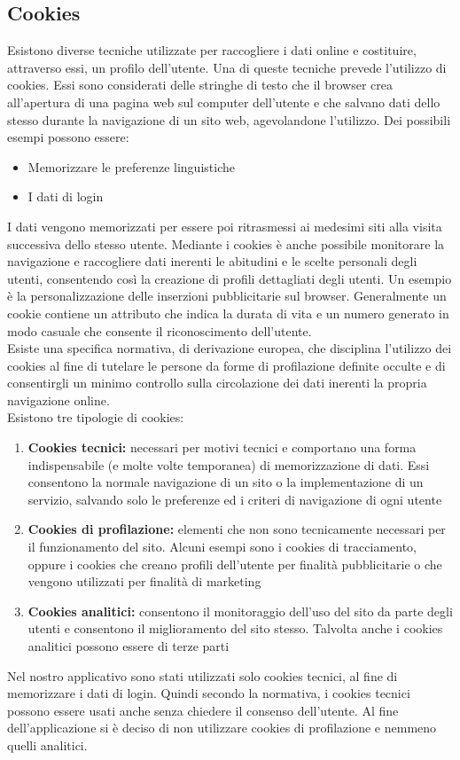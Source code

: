 \documentclass[a4paper,final,12pt]{report}
\begin{document}
\subsection{Cookies}
Esistono diverse tecniche utilizzate per raccogliere i dati online e costituire, attraverso essi, un profilo dell'utente. Una di queste tecniche prevede l'utilizzo di cookies. Essi sono considerati delle stringhe di testo che il browser crea all'apertura di una pagina web sul computer dell'utente e che salvano dati dello stesso durante la navigazione di un sito web, agevolandone l'utilizzo. Dei possibili esempi possono essere:
\begin{itemize}
\item Memorizzare le preferenze linguistiche
\item I dati di login
\end{itemize}
I dati vengono memorizzati per essere poi ritrasmessi ai medesimi siti alla visita successiva dello stesso utente. Mediante i cookies è anche possibile monitorare la navigazione e raccogliere dati inerenti le abitudini e le scelte personali degli utenti, consentendo così la creazione di profili dettagliati degli utenti. Un esempio è la personalizzazione delle inserzioni pubblicitarie sul browser. Generalmente un cookie contiene un attributo che indica la durata di vita e un numero generato in modo casuale che consente il riconoscimento dell'utente.\\
Esiste una specifica normativa, di derivazione europea, che disciplina l'utilizzo dei cookies al fine di tutelare le persone da forme di profilazione definite occulte e di consentirgli
un minimo controllo sulla circolazione dei dati inerenti la propria navigazione online.\\
Esistono tre tipologie di cookies:
\begin{enumerate}
\item \textbf{Cookies tecnici:} necessari per motivi tecnici e comportano una forma indispensabile (e molte volte temporanea) di memorizzazione di dati. Essi consentono la normale navigazione di un sito o la implementazione di un servizio, salvando solo le preferenze ed i criteri di navigazione di ogni utente
\item \textbf{Cookies di profilazione:} elementi che non sono tecnicamente necessari per il funzionamento del sito. Alcuni esempi sono i cookies di tracciamento, oppure i cookies che creano profili dell'utente per finalità pubblicitarie o che vengono utilizzati per finalità di marketing
\item \textbf{Cookies analitici:} consentono il monitoraggio dell'uso del sito da parte degli utenti e consentono il miglioramento del sito stesso. Talvolta anche i cookies analitici possono essere di terze parti
\end{enumerate}
Nel nostro applicativo sono stati utilizzati solo cookies tecnici, al fine di memorizzare i dati di login. Quindi secondo la normativa, i cookies tecnici possono essere usati anche senza chiedere il consenso dell'utente. Al fine dell'applicazione si è deciso di non utilizzare cookies di profilazione e nemmeno quelli analitici.
\end{document}
